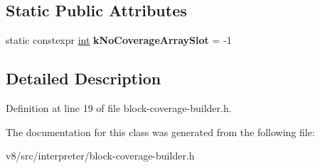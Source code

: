 \subsection*{Static Public Attributes}
\begin{DoxyCompactItemize}
\item 
\mbox{\label{classv8_1_1internal_1_1interpreter_1_1BlockCoverageBuilder_a5962c6e21a057475f2257131fc9efea4}} 
static constexpr \mbox{\hyperlink{classint}{int}} {\bfseries k\+No\+Coverage\+Array\+Slot} = -\/1
\end{DoxyCompactItemize}


\subsection{Detailed Description}


Definition at line 19 of file block-\/coverage-\/builder.\+h.



The documentation for this class was generated from the following file\+:\begin{DoxyCompactItemize}
\item 
v8/src/interpreter/block-\/coverage-\/builder.\+h\end{DoxyCompactItemize}
